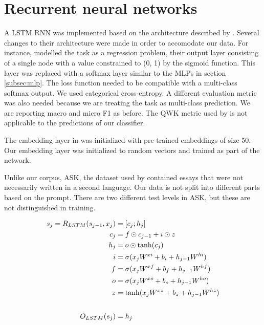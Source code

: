 \section{Recurrent neural networks}

A \ac{LSTM} \ac{RNN} was implemented based on the architecture described by
\textcite{taghipour16}. Several changes to their architecture were made in
order to accomodate our data. For instance, \citeauthor{taghipour16} modelled
the task as a regression problem, their output layer consisting of a single
node with a value constrained to (0, 1) by the sigmoid function. This layer
was replaced with a softmax layer similar to the \acp{MLP} in section
\ref{subsec:mlp}. The loss function needed to be compatible with a
multi-class softmax output. We used categorical cross-entropy. A different
evaluation metric was also needed because we are treating the task as
multi-class prediction. We are reporting macro and micro F1 as before. The
\ac{QWK} metric used by \citeauthor{taghipour16} is not applicable to the
predictions of our classifier.

The embedding layer in \textcite{taghipour16} was initialized with
pre-trained embeddings of size 50. Our embedding layer was initialized to
random vectors and trained as part of the network.

Unlike our corpus, ASK, the dataset used by \citeauthor{taghipour16}
contained essays that were not necessarily written in a second language. Our
data is not split into different parts based on the prompt. There are two
different test levels in ASK, but these are not distinguished in training.

\begin{equation}
  \begin{aligned}
  s_j = R_{LSTM}(s_{j-1}, x_j) &= [c_j;h_j] \\
                           c_j &= f \odot c_{j-1} + i \odot z \\
                           h_j &= o \odot \tanh(c_j) \\
                             i &= \sigma(x_j W^{xi} + b_i + h_{j-1} W^{hi}) \\
                             f &= \sigma(x_j W^{xf} + b_f + h_{j-1} W^{hf}) \\
                             o &= \sigma(x_j W^{xo} + b_o + h_{j-1} W^{ho}) \\
                             z &= \tanh(x_j W^{xz} + b_z + h_{j-1} W^{hz}) \\
                             \\[1\jot]
                 O_{LSTM}(s_j) &= h_j
  \end{aligned}
\end{equation}

